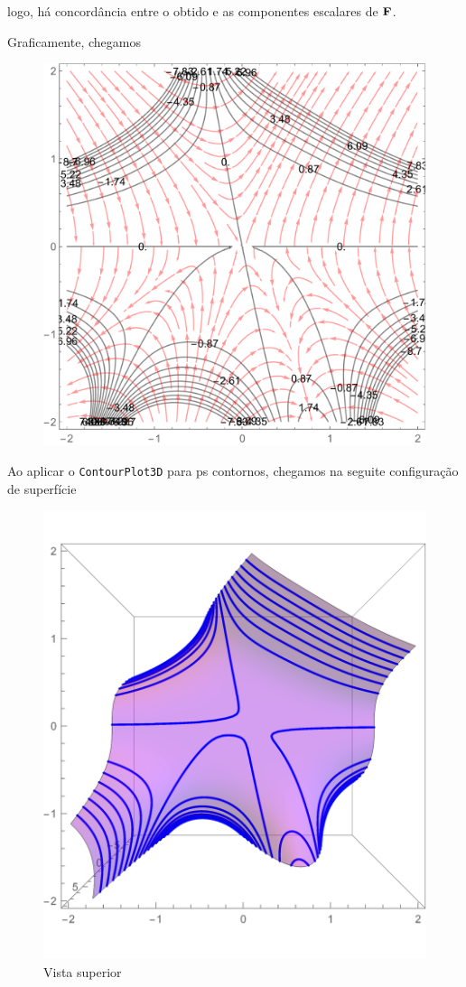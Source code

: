 \documentclass[a4paper, 12pt, brazilian]{article}
\begin{document}
	logo, há concordância entre o obtido e as componentes escalares de $\textbf{F}$.
	
	Graficamente, chegamos
	
	\begin{figure}[H]
		\centering
		\includegraphics[width=0.7\linewidth]{images/g15}
		\label{fig:g15}
	\end{figure}

	Ao aplicar o \texttt{ContourPlot3D} para ps contornos, chegamos na seguite configuração de superfície
	
	\begin{figure}[H]
		\centering
		\includegraphics[width=0.6\linewidth]{images/g153d1}
		\caption{Vista superior}
	\end{figure}
\end{document}
